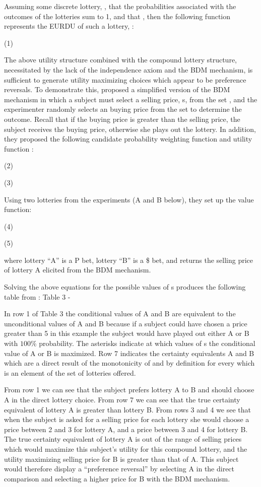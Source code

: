 Assuming some discrete lottery, , that the probabilities associated with the outcomes of the lotteries sum to 1, and that , then the following function represents the  EURDU of such a lottery, \textcite{Karni1987}:

(1)	

The above utility structure combined with the compound lottery structure, necessitated by the lack of the independence axiom and the BDM mechanism, is sufficient to generate utility maximizing choices which appear to be preference reversals. To demonstrate this, \textcite{Karni1987} proposed a simplified version of the BDM mechanism in which a subject must select a selling price, s, from the set , and the experimenter randomly selects an buying price from the set  to determine the outcome.
Recall that if the buying price is greater than the selling price, the subject receives the buying price, otherwise she plays out the lottery.
In addition, they proposed the following candidate probability weighting function and utility function :

(2)	

(3)	

Using two lotteries from the \textcite{Grether1979} experiments (A and B below), they set up the value function:

(4)	

(5)	

where lottery \enquote{A} is a P bet,  lottery \enquote{B} is a \$ bet, and  returns the selling price of lottery A elicited from the BDM mechanism.

Solving the above equations for the possible values of s produces the following table from \textcite[679]{Karni1987}:
Table 3 - \textcite{Karni1987}


In row 1 of Table 3 the conditional values of A and B are equivalent to the unconditional values  of A and B because if a subject could have chosen a price greater than 5 in this example the subject would have played out either A or B with $100\%$ probability.
The asterisks indicate at which values of s the conditional value of A or B is maximized.
Row 7 indicates the certainty equivalents A and B which are a direct result of the monotonicity of  and by definition  for every  which is an element of the set of lotteries offered. 

From row 1 we can see that the subject prefers lottery A to B and should choose A in the direct lottery choice.
From row 7 we can see that the true certainty equivalent of lottery A is greater than lottery B.
From rows 3 and 4 we see that when the subject is asked for a selling price for each lottery she would choose a price between 2 and 3 for lottery A, and a price between 3 and 4 for lottery B.
The true certainty equivalent of lottery A is out of the range of selling prices which would maximize this subject's utility for this compound lottery, and the utility maximizing selling price for B is greater than that of A.
This subject would therefore display a \enquote{preference reversal} by selecting A in the direct comparison and selecting a higher price for B with the BDM mechanism.

